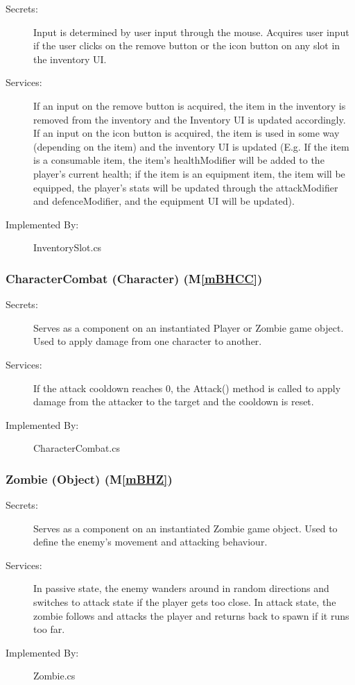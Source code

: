 \documentclass[12pt, titlepage]{article}
\newcommand{\mref}[1]{M\ref{#1}}
\begin{document}
\begin{description}
\item[Secrets:] Input is determined by user input through the mouse. Acquires user input if the user clicks on the remove button or the icon button on any slot in the inventory UI.
\item[Services:] If an input on the remove button is acquired, the item in the inventory is removed from the inventory and the Inventory UI is updated accordingly. If an input on the icon button is acquired, the item is used in some way (depending on the item) and the inventory UI is updated (E.g. If the item is a consumable item, the item's healthModifier will be added to the player's current health; if the item is an equipment item, the item will be equipped, the player's stats will be updated through the attackModifier and defenceModifier,  and the equipment UI will be updated).
\item[Implemented By:] InventorySlot.cs
\end{description}

\subsubsection{CharacterCombat (Character) (\mref{mBHCC})}

\begin{description}
	\item[Secrets:] Serves as a component on an instantiated Player or Zombie game object. Used to apply damage from one character to another.
	\item[Services:] If the attack cooldown reaches 0, the Attack() method is called to apply damage from the attacker to the target and the cooldown is reset.
	\item[Implemented By:] CharacterCombat.cs
\end{description}

\subsubsection{Zombie (Object) (\mref{mBHZ})}

\begin{description}
	\item[Secrets:] Serves as a component on an instantiated Zombie game object. Used to define the enemy's movement and attacking behaviour.
	\item[Services:] In passive state, the enemy wanders around in random directions and switches to attack state if the player gets too close. In attack state, the zombie follows and attacks the player and returns back to spawn if it runs too far.
	\item[Implemented By:] Zombie.cs
\end{description}
\end{document}
